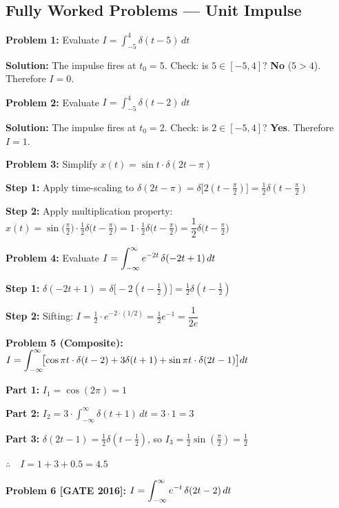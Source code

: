 \documentclass[10pt,a4paper]{article}
\newcommand{\Int}{\displaystyle\int_{-\infty}^{\infty}}
\begin{document}
\subsection*{Fully Worked Problems --- Unit Impulse}

\begin{exbox}
\textbf{Problem 1:} Evaluate $I=\displaystyle\int_{-5}^{4}\delta(t-5)\,dt$

\textbf{Solution:} The impulse fires at $t_0=5$. Check: is $5\in[-5,4]$? \textbf{No} ($5>4$). Therefore $I=\boxed{0}$.

\medskip
\textbf{Problem 2:} Evaluate $I=\displaystyle\int_{-5}^{4}\delta(t-2)\,dt$

\textbf{Solution:} The impulse fires at $t_0=2$. Check: is $2\in[-5,4]$? \textbf{Yes}. Therefore $I=\boxed{1}$.

\medskip
\textbf{Problem 3:} Simplify $x(t)=\sin t\cdot\delta(2t-\pi)$

\textbf{Step 1:} Apply time-scaling to $\delta(2t-\pi)=\delta\bigl[2(t-\tfrac{\pi}{2})\bigr]=\tfrac{1}{2}\delta(t-\tfrac{\pi}{2})$

\textbf{Step 2:} Apply multiplication property: $x(t)=\sin\!\bigl(\tfrac{\pi}{2}\bigr)\cdot\tfrac{1}{2}\delta\!\bigl(t-\tfrac{\pi}{2}\bigr)=1\cdot\tfrac{1}{2}\delta\!\bigl(t-\tfrac{\pi}{2}\bigr)=\boxed{\dfrac{1}{2}\delta\!\bigl(t-\tfrac{\pi}{2}\bigr)}$

\medskip
\textbf{Problem 4:} Evaluate $I=\displaystyle\Int e^{-2t}\,\delta(-2t+1)\,dt$

\textbf{Step 1:} $\delta(-2t+1)=\delta\bigl[-2(t-\tfrac{1}{2})\bigr]=\tfrac{1}{2}\delta(t-\tfrac{1}{2})$

\textbf{Step 2:} Sifting: $I=\tfrac{1}{2}\cdot e^{-2\cdot(1/2)}=\tfrac{1}{2}e^{-1}=\boxed{\dfrac{1}{2e}}$

\medskip
\textbf{Problem 5 (Composite):} $I=\displaystyle\Int\!\bigl[\cos\pi t\cdot\delta(t-2)+3\delta(t+1)+\sin\pi t\cdot\delta(2t-1)\bigr]dt$

\textbf{Part 1:} $I_1 = \cos(2\pi)=1$

\textbf{Part 2:} $I_2 = 3\cdot\Int\delta(t+1)\,dt=3\cdot 1=3$

\textbf{Part 3:} $\delta(2t-1)=\tfrac{1}{2}\delta(t-\tfrac{1}{2})$, so $I_3=\tfrac{1}{2}\sin(\tfrac{\pi}{2})=\tfrac{1}{2}$

$\therefore\quad I = 1+3+0.5 = \boxed{4.5}$

\medskip
\textbf{Problem 6 [GATE 2016]:} $I=\displaystyle\Int e^{-t}\,\delta(2t-2)\,dt$


\end{exbox}
\end{document}
